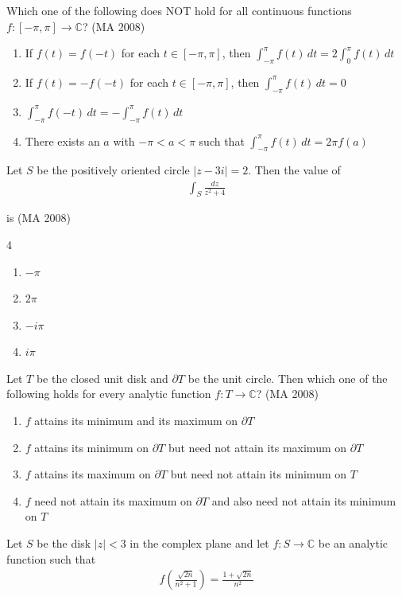 \item
Which one of the following does NOT hold for all continuous functions $f : [-\pi, \pi] \rightarrow \mathbb{C}$?
\hfill (MA 2008)
\begin{enumerate}
    \item If $f(t) = f(-t)$ for each $t \in [-\pi, \pi]$, then $\int_{-\pi}^{\pi} f(t) \, dt = 2 \int_0^\pi f(t)\, dt$
    \item If $f(t) = -f(-t)$ for each $t \in [-\pi, \pi]$, then $\int_{-\pi}^{\pi} f(t) \, dt = 0$
    \item $\int_{-\pi}^{\pi} f(-t) \, dt = -\int_{-\pi}^{\pi} f(t)\, dt$
    \item There exists an $a$ with $-\pi < a < \pi$ such that $\int_{-\pi}^{\pi} f(t)\, dt = 2\pi f(a)$
\end{enumerate}

\item
Let $S$ be the positively oriented circle $|z-3i|=2$. Then the value of
\begin{align}
    \int_S \frac{dz}{z^2 + 4}
\end{align}

is
\hfill (MA 2008)
\begin{multicols}{4}
\begin{enumerate}
    \item $-\pi$
    \item $2\pi$
    \item $-i\pi$
    \item $i\pi$
\end{enumerate}
\end{multicols}


\item
Let $T$ be the closed unit disk and $\partial T$ be the unit circle. Then which one of the following holds for every analytic function $f : T \to \mathbb{C}$?
\hfill (MA 2008)
\begin{enumerate}
    \item $f$ attains its minimum and its maximum on $\partial T$
    \item $f$ attains its minimum on $\partial T$ but need not attain its maximum on $\partial T$
    \item $f$ attains its maximum on $\partial T$ but need not attain its minimum on $T$
    \item $f$ need not attain its maximum on $\partial T$ and also need not attain its minimum on $T$
\end{enumerate}

\item
Let $S$ be the disk $|z| < 3$ in the complex plane and let $f:S \to \mathbb{C}$ be an analytic function such that
\begin{align}
    f\left(\frac{\sqrt{2n}}{n^2+1}\right) = \frac{1+\sqrt{2n}}{n^2}
\end{align}

